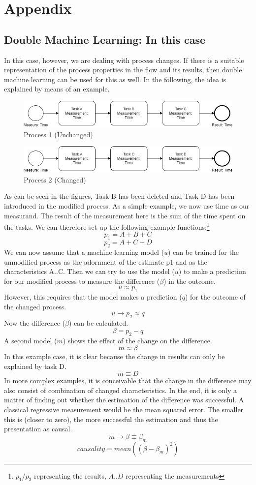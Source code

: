 \chapter{Appendix}

\section{Double Machine Learning: In this case}
In this case, however, we are dealing with process changes. If there is a suitable representation of the process properties in the flow and its results, then double machine learning can be used for this as well. In the following, the idea is explained by means of an example.
\begin{figure}[H]
    \centering
    \includegraphics[width=0.99\textwidth-2\fboxsep-2\fboxrule]{includes/p1.png}
    \caption{Process 1 (Unchanged)}
    \label{p1}
\end{figure}
\begin{figure}[H]
    \centering
    \includegraphics[width=0.99\textwidth-2\fboxsep-2\fboxrule]{includes/p2.png}
    \caption{Process 2 (Changed)}
    \label{p2}
\end{figure}
As can be seen in the figures, Task B has been deleted and Task D has been introduced in the modified process. As a simple example, we now use time as our measurand. The result of the measurement here is the sum of the time spent on the tasks. We can therefore set up the following example functions:\footnote{$p_1$/$p_2$ representing the results, $A$..$D$ representing the measurements}\\
\[p_1 = A + B + C\]
\[p_2 = A + C + D\]
We can now assume that a machine learning model ($u$) can be trained for the unmodified process as the adornment of the estimate p1 and as the characteristics A..C. Then we can try to use the model ($u$) to make a prediction for our modified process to measure the difference ($\beta$) in the outcome.
\[u \approx p_1\]
However, this requires that the model makes a prediction ($q$) for the outcome of the changed process.
\[u \rightarrow p_2 \approx q\]
Now the difference ($\beta$) can be calculated.
\[\beta = p_2 - q\]
A second model ($m$) shows the effect of the change on the difference.
\[m \approx \beta\]
In this example case, it is clear because the change in results can only be explained by task D.
\[m \equiv D\]
In more complex examples, it is conceivable that the change in the difference may also consist of combination of changed characteristics. In the end, it is only a matter of finding out whether the estimation of the difference was successful. A classical regressive measurement would be the mean squared error. The smaller this is (closer to zero), the more successful the estimation and thus the presentation as causal.
\[m \rightarrow \beta \equiv \beta_m\]
\[causality = mean((\beta-\beta_m)^2)\]
\clearpage